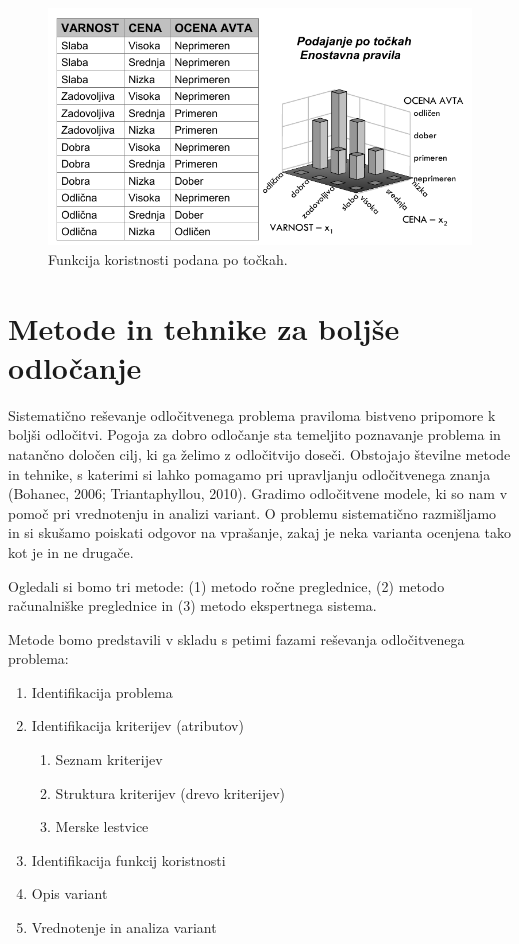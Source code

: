 \begin{figure}[htbp]
\begin{center}
\includegraphics[width=12cm]{slike/tockovna-podaja-koristnosti.pdf}
\caption{Funkcija koristnosti podana po točkah.}
\label{f-tockovna-podaja-koristnosti}
\end{center}
\end{figure}

\section{Metode in tehnike za boljše odločanje}

Sistematično reševanje odločitvenega problema praviloma bistveno pripomore k boljši odločitvi. Pogoja za dobro odločanje sta temeljito poznavanje problema in natančno določen cilj, ki ga želimo z odločitvijo doseči. Obstojajo številne metode in tehnike, s katerimi si lahko pomagamo pri upravljanju odločitvenega znanja (Bohanec, 2006; Triantaphyllou, 2010). Gradimo odločitvene modele, ki so nam v pomoč pri vrednotenju in analizi variant. O problemu sistematično razmišljamo in si skušamo poiskati odgovor na vprašanje, zakaj je neka varianta ocenjena tako kot je in ne drugače.

Ogledali si bomo tri metode: (1) metodo ročne preglednice, (2) metodo računalniške preglednice in (3) metodo ekspertnega sistema.

Metode bomo predstavili v skladu s petimi fazami reševanja odločitvenega problema:

\begin{enumerate}
\item Identifikacija problema
\item Identifikacija kriterijev (atributov)
\begin{enumerate}
\item Seznam kriterijev
\item Struktura kriterijev (drevo kriterijev)
\item Merske lestvice
\end{enumerate}
\item Identifikacija funkcij koristnosti
\item Opis variant
\item Vrednotenje in analiza variant
\end{enumerate}

